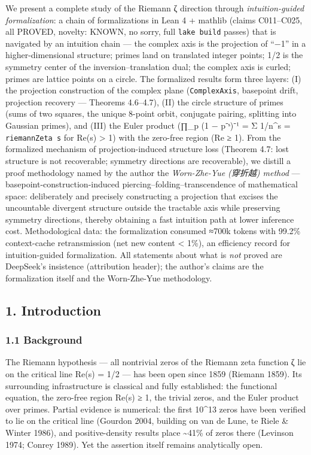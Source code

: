 \documentclass[
]{article}
\begin{document}
We present a complete study of the Riemann ζ direction through
\emph{intuition-guided formalization}: a chain of formalizations in Lean
4 + mathlib (claims C011--C025, all PROVED, novelty: KNOWN, no sorry,
full \texttt{lake\ build} passes) that is navigated by an intuition
chain --- the complex axis is the projection of ``−1'' in a
higher-dimensional structure; primes land on translated integer points;
1/2 is the symmetry center of the inversion--translation dual; the
complex axis is curled; primes are lattice points on a circle. The
formalized results form three layers: (I) the projection construction of
the complex plane (\texttt{ComplexAxis}, basepoint drift, projection
recovery --- Theorems 4.6--4.7), (II) the circle structure of primes
(sums of two squares, the unique 8-point orbit, conjugate pairing,
splitting into Gaussian primes), and (III) the Euler product (∏\_p (1 −
p⁻ˢ)⁻¹ = Σ 1/n\^{}s = \texttt{riemannZeta\ s} for Re(s) \textgreater{}
1) with the zero-free region (Re ≥ 1). From the formalized mechanism of
projection-induced structure loss (Theorem 4.7: lost structure is not
recoverable; symmetry directions are recoverable), we distill a proof
methodology named by the author the \emph{Worn-Zhe-Yue (穿折越) method}
--- basepoint-construction-induced piercing--folding--transcendence of
mathematical space: deliberately and precisely constructing a projection
that excises the uncountable divergent structure outside the tractable
axis while preserving symmetry directions, thereby obtaining a fast
intuition path at lower inference cost. Methodological data: the
formalization consumed ≈700k tokens with 99.2\% context-cache
retransmission (net new content \textless{} 1\%), an efficiency record
for intuition-guided formalization. All statements about what is
\emph{not} proved are DeepSeek's insistence (attribution header); the
author's claims are the formalization itself and the Worn-Zhe-Yue
methodology.

\subsection{1. Introduction}\label{introduction}

\subsubsection{1.1 Background}\label{background}

The Riemann hypothesis --- all nontrivial zeros of the Riemann zeta
function ζ lie on the critical line Re(s) = 1/2 --- has been open since
1859 (Riemann 1859). Its surrounding infrastructure is classical and
fully established: the functional equation, the zero-free region Re(s) ≥
1, the trivial zeros, and the Euler product over primes. Partial
evidence is numerical: the first 10\^{}13 zeros have been verified to
lie on the critical line (Gourdon 2004, building on van de Lune, te
Riele \& Winter 1986), and positive-density results place
\textasciitilde41\% of zeros there (Levinson 1974; Conrey 1989). Yet the
assertion itself remains analytically open.
\end{document}
